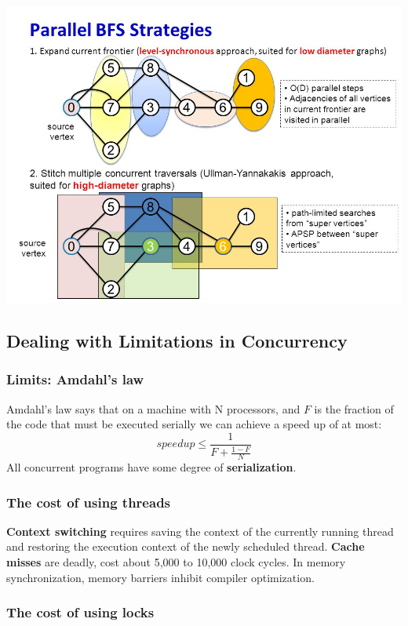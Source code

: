 \documentclass{article}
\begin{document}
\begin{center}
    \includegraphics[scale=0.4]{img/parallel-bfs.jpg}
\end{center}

\subsection{Dealing with Limitations in Concurrency}
\subsubsection{Limits: Amdahl's law}
Amdahl's law says that on a machine with N processors, and $F$ is the fraction of the code that must be executed serially we can achieve a speed up of at most:
\begin{equation}
    speedup \leq \frac{1}{F+\frac{1-F}{N}}
\end{equation}
All concurrent programs have some degree of \textbf{serialization}.

\subsubsection{The cost of using threads}
\textbf{Context switching} requires saving the context of the currently running thread and restoring the execution context of the newly scheduled thread. \textbf{Cache misses} are deadly, cost about 5,000 to 10,000 clock cycles. In memory synchronization, memory barriers inhibit compiler optimization.

\subsubsection{The cost of using locks}
\end{document}
